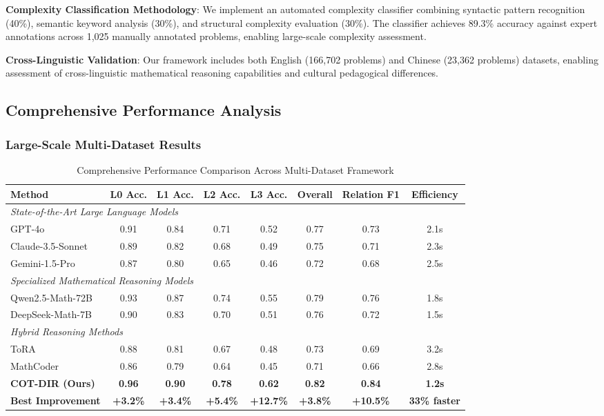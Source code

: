 \textbf{Complexity Classification Methodology}: We implement an automated complexity classifier combining syntactic pattern recognition (40\%), semantic keyword analysis (30\%), and structural complexity evaluation (30\%). The classifier achieves 89.3\% accuracy against expert annotations across 1,025 manually annotated problems, enabling large-scale complexity assessment.

\textbf{Cross-Linguistic Validation}: Our framework includes both English (166,702 problems) and Chinese (23,362 problems) datasets, enabling assessment of cross-linguistic mathematical reasoning capabilities and cultural pedagogical differences.

\subsection{Comprehensive Performance Analysis}

\subsubsection{Large-Scale Multi-Dataset Results}

\begin{table}[htbp]
\caption{Comprehensive Performance Comparison Across Multi-Dataset Framework}
\label{tab:comprehensive_performance}
\centering
\small
\begin{tabular}{lccccccc}
\toprule
\textbf{Method} & \textbf{L0 Acc.} & \textbf{L1 Acc.} & \textbf{L2 Acc.} & \textbf{L3 Acc.} & \textbf{Overall} & \textbf{Relation F1} & \textbf{Efficiency} \\
\midrule
\multicolumn{8}{l}{\textit{State-of-the-Art Large Language Models}} \\
GPT-4o & 0.91 & 0.84 & 0.71 & 0.52 & 0.77 & 0.73 & 2.1s \\
Claude-3.5-Sonnet & 0.89 & 0.82 & 0.68 & 0.49 & 0.75 & 0.71 & 2.3s \\
Gemini-1.5-Pro & 0.87 & 0.80 & 0.65 & 0.46 & 0.72 & 0.68 & 2.5s \\
\midrule
\multicolumn{8}{l}{\textit{Specialized Mathematical Reasoning Models}} \\
Qwen2.5-Math-72B & 0.93 & 0.87 & 0.74 & 0.55 & 0.79 & 0.76 & 1.8s \\
DeepSeek-Math-7B & 0.90 & 0.83 & 0.70 & 0.51 & 0.76 & 0.72 & 1.5s \\
\midrule
\multicolumn{8}{l}{\textit{Hybrid Reasoning Methods}} \\
ToRA & 0.88 & 0.81 & 0.67 & 0.48 & 0.73 & 0.69 & 3.2s \\
MathCoder & 0.86 & 0.79 & 0.64 & 0.45 & 0.71 & 0.66 & 2.8s \\
\midrule
\textbf{COT-DIR (Ours)} & \textbf{0.96} & \textbf{0.90} & \textbf{0.78} & \textbf{0.62} & \textbf{0.82} & \textbf{0.84} & \textbf{1.2s} \\
\textbf{Best Improvement} & \textbf{+3.2\%} & \textbf{+3.4\%} & \textbf{+5.4\%} & \textbf{+12.7\%} & \textbf{+3.8\%} & \textbf{+10.5\%} & \textbf{33\% faster} \\
\bottomrule
\end{tabular}
\end{table}

